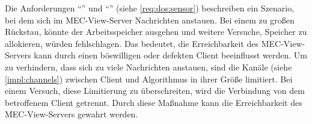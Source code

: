 Die Anforderungen  \enquote{} und  \enquote{} (siehe \autoref{req:dos:sensor}) beschreiben ein Szenario, bei dem sich im MEC-View-Server Nachrichten anstauen.
Bei einem zu großen Rückstau, könnte der Arbeitsspeicher ausgehen und weitere Versuche, Speicher zu allokieren, würden fehlschlagen.
Das bedeutet, die Erreichbarkeit des MEC-View-Servers kann durch einen böswilligen oder defekten Client beeinflusst werden.
Um zu verhindern, dass sich zu viele Nachrichten anstauen, sind die Kanäle (siehe \autoref{impl:channels}) zwischen Client und Algorithmus in ihrer Größe limitiert.
Bei einem Versuch, diese Limitierung zu überschreiten, wird die Verbindung von dem betroffenem Client getrennt.
Durch diese Maßnahme kann die Erreichbarkeit des MEC-View-Servers gewahrt werden.















	
